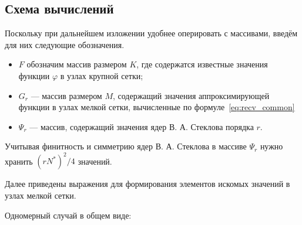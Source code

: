 





\subsection*{Схема вычислений}

Поскольку при дальнейшем изложении удобнее оперировать с 
массивами, введём для них следующие обозначения.
\begin{itemize}

\item
  $F$ обозначим массив размером $K$,
  где содержатся известные значения функции $\varphi$
  в узлах крупной сетки;

\item
  $G_r$ --- массив размером  $M$,
  содержащий 
  значения аппроксимирующей функции в узлах мелкой сетки,
  вычисленные по формуле~\eqref{eq:recv_common}
%

\item
  $\Psi_{r}$ --- массив, содержащий значения ядер В. А. Стеклова порядка $r$.
%

\end{itemize}


Учитывая финитность и симметрию ядер В. А. Стеклова
в массиве $\Psi_{r}$ нужно хранить $(rN^*)^2/4$
значений.


Далее приведены выражения для формирования
элементов искомых значений в узлах мелкой сетки.

Одномерный случай в общем виде:

